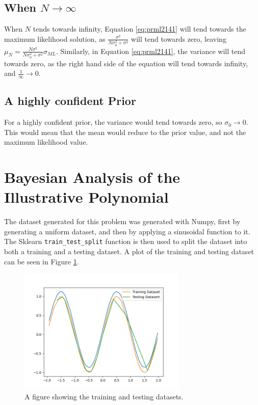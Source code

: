 \documentclass[a4paper, 11pt]{article}
\begin{document}
\subsection{When $N \rightarrow \infty$}

When $N$ tends towards infinity, Equation \ref{eq:prml2141} will tend towards the maximum likelihood solution, as $\frac{\sigma^2}{N\sigma_0^2 + \sigma^2}$ will tend towards zero, leaving $\mu_N = \frac{N\sigma^2}{N\sigma_0^2 + \sigma^2}\sigma_{ML}$. 
Similarly, in Equation \ref{eq:prml2141}, the variance will tend towards zero, as the right hand side of the equation will tend towards infinity, and $\frac{1}{\infty} \rightarrow 0$.

\subsection{A highly confident Prior}

For a highly confident prior, the variance would tend towards zero, so $\sigma_0 \rightarrow 0$. This would mean that the mean would reduce to the prior value, and not the maximum likelihood value. 

\section{Bayesian Analysis of the Illustrative Polynomial}

The dataset generated for this problem was generated with Numpy, first by generating a uniform dataset, and then by applying a sinusoidal function to it. The Sklearn \verb|train_test_split| function is then used to split the dataset into both a training and a testing dataset. A plot of the training and testing dataset can be seen in Figure \ref{fig:traintestsplit}.

\begin{figure}[h]
    \includegraphics[width=8cm]{fig/traintestsplit.png}
    \caption{A figure showing the training and testing datasets.}
    \label{fig:traintestsplit}
\end{figure}
\end{document}
